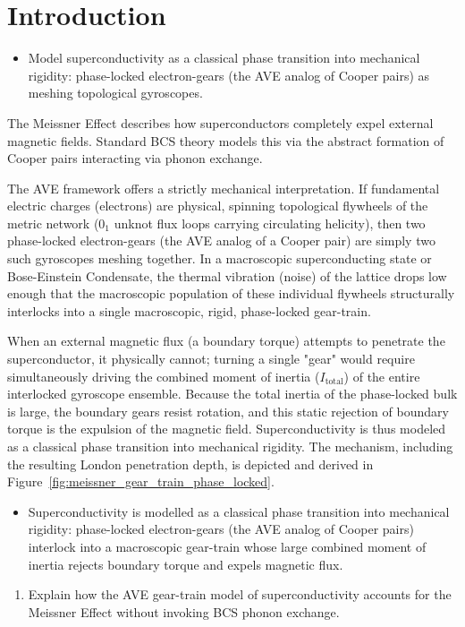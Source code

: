 \section{Introduction}

\begin{objectivebox}
\begin{itemize}
    \item Model superconductivity as a classical phase transition into mechanical rigidity: phase-locked electron-gears (the AVE analog of Cooper pairs) as meshing topological gyroscopes.
\end{itemize}
\end{objectivebox}

The Meissner Effect describes how superconductors completely expel external magnetic fields. Standard BCS theory models this via the abstract formation of Cooper pairs interacting via phonon exchange.

The AVE framework offers a strictly mechanical interpretation. If fundamental electric charges (electrons) are physical, spinning topological flywheels of the metric network ($0_1$ unknot flux loops carrying circulating helicity), then two phase-locked electron-gears (the AVE analog of a Cooper pair) are simply two such gyroscopes meshing together. In a macroscopic superconducting state or Bose-Einstein Condensate, the thermal vibration (noise) of the lattice drops low enough that the macroscopic population of these individual flywheels structurally interlocks into a single macroscopic, rigid, phase-locked gear-train.

When an external magnetic flux (a boundary torque) attempts to penetrate the superconductor, it physically cannot; turning a single "gear" would require simultaneously driving the combined moment of inertia ($I_{\text{total}}$) of the entire interlocked gyroscope ensemble. Because the total inertia of the phase-locked bulk is large, the boundary gears resist rotation, and this static rejection of boundary torque is the expulsion of the magnetic field. Superconductivity is thus modeled as a classical phase transition into mechanical rigidity. The mechanism, including the resulting London penetration depth, is depicted and derived in Figure~\ref{fig:meissner_gear_train_phase_locked}.

\begin{summarybox}
\begin{itemize}
    \item Superconductivity is modelled as a classical phase transition into mechanical rigidity: phase-locked electron-gears (the AVE analog of Cooper pairs) interlock into a macroscopic gear-train whose large combined moment of inertia rejects boundary torque and expels magnetic flux.
\end{itemize}
\end{summarybox}

\begin{exercisebox}
\begin{enumerate}
    \item Explain how the AVE gear-train model of superconductivity accounts for the Meissner Effect without invoking BCS phonon exchange.
\end{enumerate}
\end{exercisebox}

